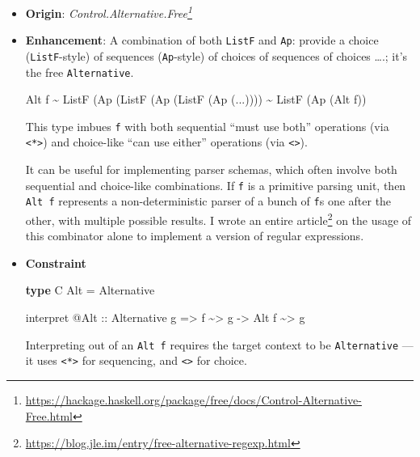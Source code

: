 \documentclass[]{article}
\newenvironment{Shaded}{}{}
\newcommand{\DataTypeTok}[1]{\textcolor[rgb]{0.56,0.13,0.00}{#1}}
\newcommand{\KeywordTok}[1]{\textcolor[rgb]{0.00,0.44,0.13}{\textbf{#1}}}
\newcommand{\NormalTok}[1]{#1}
\newcommand{\OperatorTok}[1]{\textcolor[rgb]{0.40,0.40,0.40}{#1}}
\newcommand{\OtherTok}[1]{\textcolor[rgb]{0.00,0.44,0.13}{#1}}
\renewcommand{\href}[2]{#2\footnote{\url{#1}}}
\begin{document}
\begin{itemize}
\item
  \textbf{Origin}:
  \emph{\href{https://hackage.haskell.org/package/free/docs/Control-Alternative-Free.html}{Control.Alternative.Free}}
\item
  \textbf{Enhancement}: A combination of both \texttt{ListF} and \texttt{Ap}:
  provide a choice (\texttt{ListF}-style) of sequences (\texttt{Ap}-style) of
  choices of sequences of choices \ldots.; it's the free \texttt{Alternative}.

\begin{Shaded}
\begin{Highlighting}[]
\DataTypeTok{Alt}\NormalTok{ f }\OperatorTok{\textasciitilde{}} \DataTypeTok{ListF}\NormalTok{ (}\DataTypeTok{Ap}\NormalTok{ (}\DataTypeTok{ListF}\NormalTok{ (}\DataTypeTok{Ap}\NormalTok{ (}\DataTypeTok{ListF}\NormalTok{ (}\DataTypeTok{Ap}\NormalTok{ (}\OperatorTok{...}\NormalTok{))))}
      \OperatorTok{\textasciitilde{}} \DataTypeTok{ListF}\NormalTok{ (}\DataTypeTok{Ap}\NormalTok{ (}\DataTypeTok{Alt}\NormalTok{ f))}
\end{Highlighting}
\end{Shaded}

  This type imbues \texttt{f} with both sequential ``must use both'' operations
  (via \texttt{\textless{}*\textgreater{}}) and choice-like ``can use either''
  operations (via \texttt{\textless{}\textbar{}\textgreater{}}).

  It can be useful for implementing parser schemas, which often involve both
  sequential and choice-like combinations. If \texttt{f} is a primitive parsing
  unit, then \texttt{Alt\ f} represents a non-deterministic parser of a bunch of
  \texttt{f}s one after the other, with multiple possible results. I wrote
  \href{https://blog.jle.im/entry/free-alternative-regexp.html}{an entire
  article} on the usage of this combinator alone to implement a version of
  regular expressions.
\item
  \textbf{Constraint}

\begin{Shaded}
\begin{Highlighting}[]
\KeywordTok{type} \DataTypeTok{C} \DataTypeTok{Alt} \OtherTok{=} \DataTypeTok{Alternative}

\NormalTok{interpret }\OperatorTok{@}\DataTypeTok{Alt}
\OtherTok{    ::} \DataTypeTok{Alternative}\NormalTok{ g}
    \OtherTok{=>}\NormalTok{ f }\OperatorTok{\textasciitilde{}>}\NormalTok{ g}
    \OtherTok{{-}>} \DataTypeTok{Alt}\NormalTok{ f }\OperatorTok{\textasciitilde{}>}\NormalTok{ g}
\end{Highlighting}
\end{Shaded}

  Interpreting out of an \texttt{Alt\ f} requires the target context to be
  \texttt{Alternative} --- it uses \texttt{\textless{}*\textgreater{}} for
  sequencing, and \texttt{\textless{}\textbar{}\textgreater{}} for choice.
\end{itemize}
\end{document}
